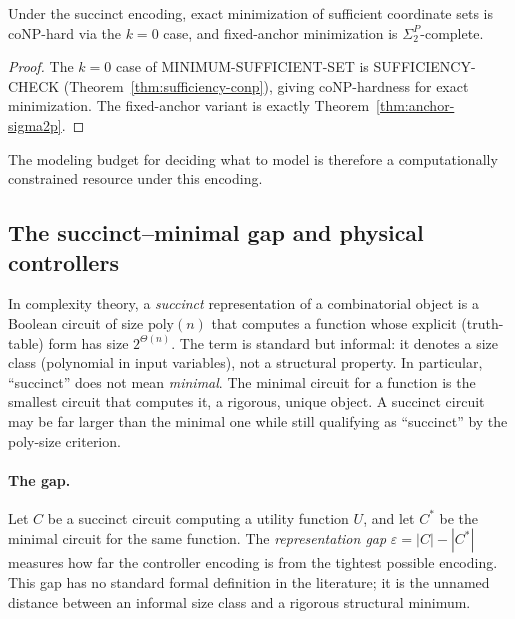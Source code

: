 \begin{corollary}
Under the succinct encoding, exact minimization of sufficient coordinate sets is coNP-hard via the $k=0$ case, and fixed-anchor minimization is $\Sigma_2^P$-complete.
\end{corollary}

\begin{proof}
The $k=0$ case of MINIMUM-SUFFICIENT-SET is SUFFICIENCY-CHECK (Theorem~\ref{thm:sufficiency-conp}), giving coNP-hardness for exact minimization. The fixed-anchor variant is exactly Theorem~\ref{thm:anchor-sigma2p}.
\end{proof}

The modeling budget for deciding what to model is therefore a computationally constrained resource under this encoding.

\subsection{The succinct--minimal gap and physical controllers}
\label{sec:neuro-correspondence}

In complexity theory, a \emph{succinct} representation of a combinatorial object is a Boolean circuit of size $\mathrm{poly}(n)$ that computes a function whose explicit (truth-table) form has size $2^{\Theta(n)}$. The term is standard but informal: it denotes a size class (polynomial in input variables), not a structural property. In particular, ``succinct'' does not mean \emph{minimal}. The minimal circuit for a function is the smallest circuit that computes it, a rigorous, unique object. A succinct circuit may be far larger than the minimal one while still qualifying as ``succinct'' by the poly-size criterion.

\paragraph{The gap.}
Let $C$ be a succinct circuit computing a utility function $U$, and let $C^*$ be the minimal circuit for the same function. The \emph{representation gap} $\varepsilon = |C| - |C^*|$ measures how far the controller encoding is from the tightest possible encoding. This gap has no standard formal definition in the literature; it is the unnamed distance between an informal size class and a rigorous structural minimum.

